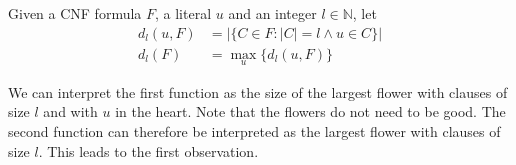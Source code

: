 \begin{definition}
    Given a CNF formula $F$, a literal $u$ and an integer $l \in \mathbb{N}$, let
    \begin{align}
        d_l(u, F) &= |\{C \in F : |C| = l \land u \in C\}| \label{eq:largest_flower_u} \\
        d_l(F) &= \max_u \{d_l(u, F)\} \label{eq:largest_flower}
    \end{align}
\end{definition}

We can interpret the first function as the size of the largest flower with clauses of size $l$
and with $u$ in the heart. Note that the flowers do not need to be good.
The second function can therefore be interpreted as the largest
flower with clauses of size $l$. This leads to the first observation.

